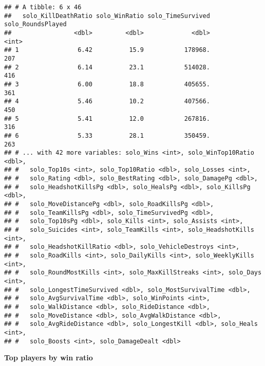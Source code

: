 \documentclass[]{article}
\begin{document}
\begin{verbatim}
## # A tibble: 6 x 46
##   solo_KillDeathRatio solo_WinRatio solo_TimeSurvived solo_RoundsPlayed
##                 <dbl>         <dbl>             <dbl>             <int>
## 1                6.42          15.9           178968.               207
## 2                6.14          23.1           514028.               416
## 3                6.00          18.8           405655.               361
## 4                5.46          10.2           407566.               450
## 5                5.41          12.0           267816.               316
## 6                5.33          28.1           350459.               263
## # ... with 42 more variables: solo_Wins <int>, solo_WinTop10Ratio <dbl>,
## #   solo_Top10s <int>, solo_Top10Ratio <dbl>, solo_Losses <int>,
## #   solo_Rating <dbl>, solo_BestRating <dbl>, solo_DamagePg <dbl>,
## #   solo_HeadshotKillsPg <dbl>, solo_HealsPg <dbl>, solo_KillsPg <dbl>,
## #   solo_MoveDistancePg <dbl>, solo_RoadKillsPg <dbl>,
## #   solo_TeamKillsPg <dbl>, solo_TimeSurvivedPg <dbl>,
## #   solo_Top10sPg <dbl>, solo_Kills <int>, solo_Assists <int>,
## #   solo_Suicides <int>, solo_TeamKills <int>, solo_HeadshotKills <int>,
## #   solo_HeadshotKillRatio <dbl>, solo_VehicleDestroys <int>,
## #   solo_RoadKills <int>, solo_DailyKills <int>, solo_WeeklyKills <int>,
## #   solo_RoundMostKills <int>, solo_MaxKillStreaks <int>, solo_Days <int>,
## #   solo_LongestTimeSurvived <dbl>, solo_MostSurvivalTime <dbl>,
## #   solo_AvgSurvivalTime <dbl>, solo_WinPoints <int>,
## #   solo_WalkDistance <dbl>, solo_RideDistance <dbl>,
## #   solo_MoveDistance <dbl>, solo_AvgWalkDistance <dbl>,
## #   solo_AvgRideDistance <dbl>, solo_LongestKill <dbl>, solo_Heals <int>,
## #   solo_Boosts <int>, solo_DamageDealt <dbl>
\end{verbatim}

\textbf{Top players by win ratio}
\end{document}
